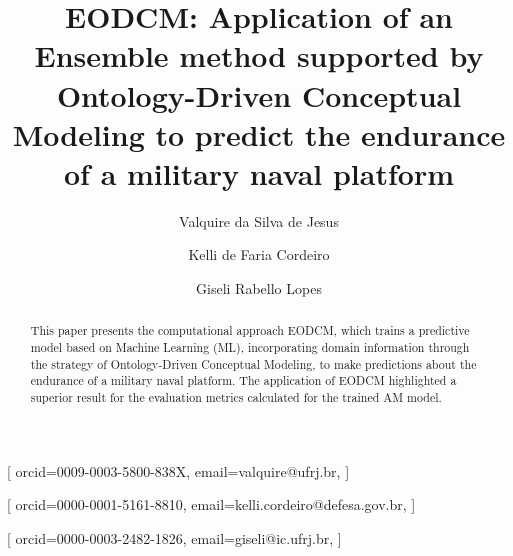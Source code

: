 \documentclass[
]{ceurart}
\begin{document}


\title{EODCM: Application of an Ensemble method supported by Ontology-Driven Conceptual Modeling to predict the endurance of a military naval platform}


\author[1,2]{Valquire da Silva de Jesus}[%
orcid=0009-0003-5800-838X,
email=valquire@ufrj.br,
]
\cormark[1]
\address[1]{Instituto de Computação (IC) – Universidade Federal do Rio de Janeiro (UFRJ), Rio de Janeiro, RJ, Brazil}
\address[2]{Centro de Análises de Sistemas Navais (CASNAV) - Marinha do Brasil, Rio de Janeiro, RJ, Brazil}

\author[3]{Kelli de Faria Cordeiro}[%
orcid=0000-0001-5161-8810,
email=kelli.cordeiro@defesa.gov.br,
]
\address[3]{Subchefia de Comando e Controle (SC-1) - Ministério da Defesa, Brasília, DF, Brazil}

\author[1]{Giseli Rabello Lopes}[%
orcid=0000-0003-2482-1826,
email=giseli@ic.ufrj.br,
]


\begin{abstract}
  This paper presents the computational approach EODCM, which trains a predictive model based on Machine Learning (ML), incorporating domain information through the strategy of Ontology-Driven Conceptual Modeling, to make predictions about the endurance of a military naval platform. The application of EODCM highlighted a superior result for the evaluation metrics calculated for the trained AM model.
\end{abstract}
\end{document}
